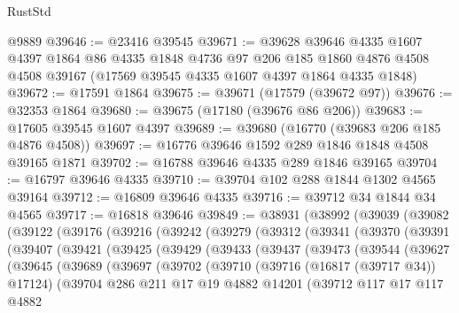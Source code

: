 \begin{lexlean}{RustStd}
\begin{coremodule}
{\begin{coremodule}
{{{{{{{{{{{{{{{{{{{{{{{{{{{{{{{{{{{{{{{{{{{{{{{{{{{{{{{    @9889
@39646 := @23416 @39545
@39671 := @39628
    @39646
    @4335
    @1607
    @4397
    @1864
    @86
    @4335
    @1848
    @4736
    @97
    @206
    @185
    @1860
    @4876
    @4508
    @4508
    @39167
    (@17569 @39545 @4335 @1607 @4397 @1864 @4335 @1848)
@39672 := @17591 @1864
@39675 := @39671 (@17579 (@39672 @97))
@39676 := @32353 @1864
@39680 := @39675 (@17180 (@39676 @86 @206))
@39683 := @17605 @39545 @1607 @4397
@39689 := @39680 (@16770 (@39683 @206 @185 @4876 @4508))
@39697 := @16776 @39646 @1592 @289 @1846 @1848 @4508 @39165 @1871
@39702 := @16788 @39646 @4335 @289 @1846 @39165
@39704 := @16797 @39646 @4335
@39710 := @39704 @102 @288 @1844 @1302 @4565 @39164
@39712 := @16809 @39646 @4335
@39716 := @39712 @34 @1844 @34 @4565
@39717 := @16818 @39646
@39849 := @38931
    (@38992
      (@39039
        (@39082
          (@39122
            (@39176
              (@39216
                (@39242
                  (@39279
                    (@39312
                      (@39341
                        (@39370
                          (@39391
                            (@39407
                              (@39421
                                (@39425
                                  (@39429
                                    (@39433
                                      (@39437
                                        (@39473
                                          (@39544
                                            (@39627
                                              (@39645
                                                (@39689
                                                  (@39697
                                                    (@39702
                                                      (@39710
                                                        (@39716 (@16817 (@39717 @34)) @17124)
                                                        (@39704
                                                          @286
                                                          @211
                                                          @17
                                                          @19
                                                          @4882
                                                          @14201
                                                          (@39712
                                                            @117
                                                            @17
                                                            @117
                                                            @4882
}}}}}}}}}}}}}}}}}}}}}}}}}}}}}}}}}}}}}}}}}}}}}}}}}}}}}}}
\end{coremodule}}
\end{coremodule}
\end{lexlean}
